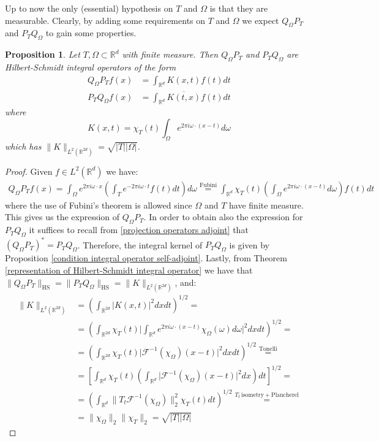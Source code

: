 \documentclass[corpo=11pt, stile=classica, tipotesi=custom,
greek, evenboxes, english]{toptesi}
\numberwithin{equation}{chapter}
\newtheorem{prop}[teo]{Proposition}
\theoremstyle{remark}
\newcommand{\R}{\mathbb{R}} %
\newcommand{\F}{\mathscr{F}} %
\begin{document}
Up to now the only (essential) hypothesis on $T$ and $\Omega$ is that they are measurable. Clearly, by adding some requirements on $T$ and $\Omega$ we expect $Q_{\Omega} P_T$ and $P_T Q_{\Omega}$ to gain some properties.
\begin{prop}\label{projection operators are Hilbert-Schmidt}
	Let $T,\Omega \subset \R^d$ with finite measure. Then $Q_{\Omega} P_T$ and $P_T Q_{\Omega}$ are Hilbert-Schmidt integral operators of the form
	\begin{align}
		Q_{\Omega} P_T f(x) &= \int_{\R^d} K(x,t) f(t) dt \\
		P_T Q_{\Omega} f(x) &= \int_{\R^d} \overline{K(t,x)}f(t)dt
	\end{align}
	where
	\begin{equation}\label{integral kernel projection operators}
		K(x,t) = \chi_T(t) \int_{\Omega} e^{2 \pi i \omega \cdot (x-t)}d\omega
	\end{equation}
	which has $\| K \|_{L^2(\R^{2d})} = \sqrt{|T||\Omega|}$.
\end{prop}
\begin{proof}
	Given $f \in L^2(\R^d)$ we have:
	\begin{align*}
		Q_{\Omega}P_T f(x) = \int_{\Omega} e^{2 \pi i \omega \cdot x} \left(\int_{T} e^{-2\pi i \omega \cdot t} f(t)dt\right)d\omega \overset{\mathrm{Fubini}}{=} \int_{\R^d} \chi_T(t) \left(\int_{\Omega} e^{2 \pi i \omega \cdot (x -t)} d\omega\right)f(t)dt
	\end{align*}
	where the use of Fubini's theorem is allowed since $\Omega$ and $T$ have finite measure. This gives us the expression of $Q_{\Omega}P_T$. In order to obtain also the expression for $P_T Q_{\Omega}$ it suffices to recall from \eqref{projection operators adjoint} that $(Q_{\Omega} P_T)^* = P_T Q_{\Omega}$. Therefore, the integral kernel of $P_T Q_{\Omega}$ is given by Proposition \ref{condition integral operator self-adjoint}. Lastly, from Theorem \ref{representation of Hilbert-Schmidt integral operator} we have that $\|Q_{\Omega} P_T\|_{\mathrm{HS}} = \|P_T Q_{\Omega}\|_{\mathrm{HS}} = \|K\|_{L^2(\R^{2d})}$, and:
	\begin{align*}
		\|K\|_{L^2(\R^{2d})} &= \left(\int_{\R^{2d}}   |K(x,t)|^2 dxdt\right)^{1/2} =\\
							 &= \left(\int_{\R^{2d}} \chi_T(t) \Bigg| \int_{\R^d} e^{2 \pi i \omega \cdot (x-t)} \chi_{\Omega}(\omega)d\omega \Bigg|^2 dxdt \right)^{1/2} = \\
							 &= \left(\int_{\R^{2d}} \chi_T(t) \big|\F^{-1}(\chi_{\Omega})(x-t)\big|^2dxdt\right)^{1/2} \overset{\mathrm{Tonelli}}{=} \\
							 &= \left[ \int_{\R^d} \chi_T(t) \left(\int_{\R^d} \big|\F^{-1}(\chi_{\Omega})(x-t)\big|^2 dx\right)dt\right]^{1/2} = \\
							 &= \left(\int_{\R^d} \| T_t \F^{-1} (\chi_{\Omega})\|_2^2 \chi_T(t)dt\right)^{1/2} \overset{T_t\,\mathrm{isometry} + \mathrm{Plancherel}}{=}\\
							 &= \| \chi_{\Omega} \|_2 \|\chi_T\|_2 = \sqrt{|T| |\Omega|}
	\end{align*}
\end{proof}
\end{document}
